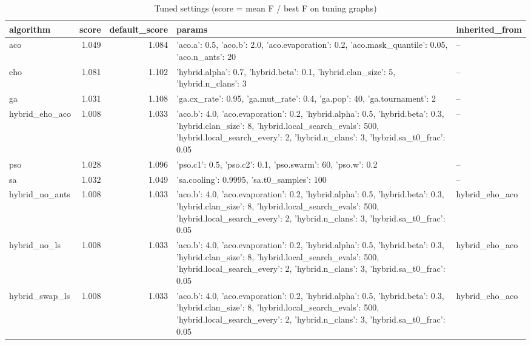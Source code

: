 \begin{table}
\caption{Tuned settings (score = mean F / best F on tuning graphs)}
\begin{tabular}{lrrll}
\toprule
algorithm & score & default_score & params & inherited_from \\
\midrule
aco & 1.049 & 1.084 & {'aco.a': 0.5, 'aco.b': 2.0, 'aco.evaporation': 0.2, 'aco.mask_quantile': 0.05, 'aco.n_ants': 20} & -- \\
eho & 1.081 & 1.102 & {'hybrid.alpha': 0.7, 'hybrid.beta': 0.1, 'hybrid.clan_size': 5, 'hybrid.n_clans': 3} & -- \\
ga & 1.031 & 1.108 & {'ga.cx_rate': 0.95, 'ga.mut_rate': 0.4, 'ga.pop': 40, 'ga.tournament': 2} & -- \\
hybrid_eho_aco & 1.008 & 1.033 & {'aco.b': 4.0, 'aco.evaporation': 0.2, 'hybrid.alpha': 0.5, 'hybrid.beta': 0.3, 'hybrid.clan_size': 8, 'hybrid.local_search_evals': 500, 'hybrid.local_search_every': 2, 'hybrid.n_clans': 3, 'hybrid.sa_t0_frac': 0.05} & -- \\
pso & 1.028 & 1.096 & {'pso.c1': 0.5, 'pso.c2': 0.1, 'pso.swarm': 60, 'pso.w': 0.2} & -- \\
sa & 1.032 & 1.049 & {'sa.cooling': 0.9995, 'sa.t0_samples': 100} & -- \\
hybrid_no_ants & 1.008 & 1.033 & {'aco.b': 4.0, 'aco.evaporation': 0.2, 'hybrid.alpha': 0.5, 'hybrid.beta': 0.3, 'hybrid.clan_size': 8, 'hybrid.local_search_evals': 500, 'hybrid.local_search_every': 2, 'hybrid.n_clans': 3, 'hybrid.sa_t0_frac': 0.05} & hybrid_eho_aco \\
hybrid_no_ls & 1.008 & 1.033 & {'aco.b': 4.0, 'aco.evaporation': 0.2, 'hybrid.alpha': 0.5, 'hybrid.beta': 0.3, 'hybrid.clan_size': 8, 'hybrid.local_search_evals': 500, 'hybrid.local_search_every': 2, 'hybrid.n_clans': 3, 'hybrid.sa_t0_frac': 0.05} & hybrid_eho_aco \\
hybrid_swap_ls & 1.008 & 1.033 & {'aco.b': 4.0, 'aco.evaporation': 0.2, 'hybrid.alpha': 0.5, 'hybrid.beta': 0.3, 'hybrid.clan_size': 8, 'hybrid.local_search_evals': 500, 'hybrid.local_search_every': 2, 'hybrid.n_clans': 3, 'hybrid.sa_t0_frac': 0.05} & hybrid_eho_aco \\
\bottomrule
\end{tabular}
\end{table}
